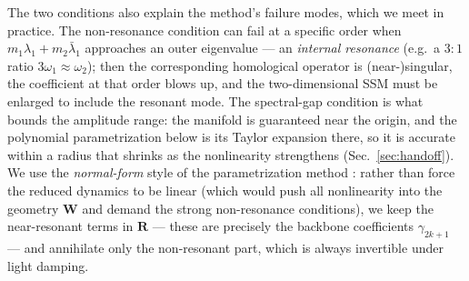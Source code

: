 \documentclass[11pt]{article}
\begin{document}
The two conditions also explain the method's failure modes, which we meet in practice.
The non-resonance condition can fail at a specific order when
$m_1\lambda_1+m_2\bar\lambda_1$ approaches an outer eigenvalue --- an \emph{internal
resonance} (e.g.\ a $3{:}1$ ratio $3\omega_1\!\approx\!\omega_2$); then the
corresponding homological operator is (near-)singular, the coefficient at that order
blows up, and the two-dimensional SSM must be enlarged to include the resonant mode.
The spectral-gap condition is what bounds the amplitude range: the manifold is
guaranteed near the origin, and the polynomial parametrization below is its Taylor
expansion there, so it is accurate within a radius that shrinks as the nonlinearity
strengthens (Sec.~\ref{sec:handoff}). We use the \emph{normal-form} style of the
parametrization method \cite{jain2022}: rather than force the reduced dynamics to be
linear (which would push all nonlinearity into the geometry $\bm W$ and demand the
strong non-resonance conditions), we keep the near-resonant terms in $\bm R$ --- these
are precisely the backbone coefficients $\gamma_{2k+1}$ --- and annihilate only the
non-resonant part, which is always invertible under light damping.
\end{document}
